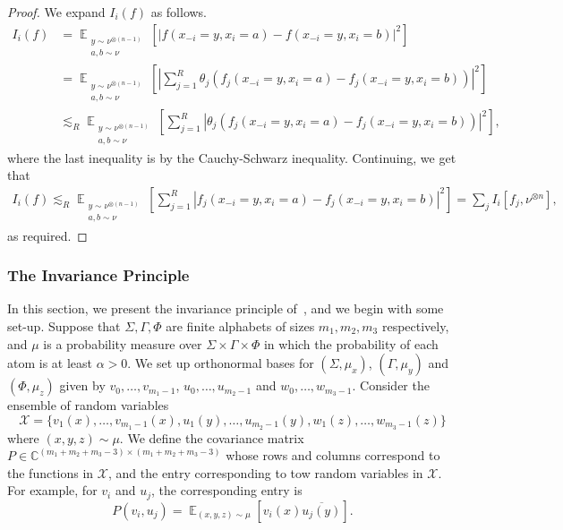 \documentclass[11pt]{article}
\newcommand\card[1]{\left| {#1} \right|}
\newcommand\Expect[2]{{\mathop{\mathbb{E}}_{#1}\left[ {#2} \right]}}
\renewcommand\leq{\leqslant}
\newcommand{\V}[1]{{#1}}
\begin{document}
\begin{proof}
We expand $I_i(f)$ as follows.
 \begin{align*}
       I_i(f)&= \Expect{\substack{\V y\sim \nu^{\otimes (n-1)}\\ a, b \sim \nu} }{\card{ f( \V x_{-i} = \V y, x_i = a) - f(\V x_{-i} = \V y, x_i = b) }^2}\\
       & = \Expect{\substack{\V y\sim \nu^{\otimes (n-1)}\\ a, b \sim \nu} }{\card{\sum_{j=1}^R \theta_j (f_j( \V x_{-i} = \V y, x_i = a) - f_j(\V x_{-i} = \V y, x_i = b))}^2}\\
       & \lesssim_R \Expect{\substack{\V y\sim \nu^{\otimes (n-1)}\\ a, b \sim \nu} }{\sum_{j=1}^R \card{\theta_j (f_j( \V x_{-i} = \V y, x_i = a) - f_j(\V x_{-i} = \V y, x_i = b))}^2},
       \end{align*}
       where the last inequality is by the Cauchy-Schwarz inequality. Continuing, we get that
       \begin{align*}
       I_i(f)\lesssim_R 
       \Expect{\substack{\V y\sim \nu^{\otimes (n-1)}\\ a, b \sim \nu} }{\sum_{j=1}^R \card{f_j( \V x_{-i} = \V y, x_i = a) - f_j(\V x_{-i} = \V y, x_i = b)}^2}
          = \sum_{j}I_i[f_j, \nu^{\otimes n}],
   \end{align*}
   as required.
\end{proof}
\subsubsection{The Invariance Principle}\label{sec:invariance_principle}
In this section, we present the invariance principle of~\cite{MOO}, and we begin with some set-up.
Suppose that $\Sigma,\Gamma,\Phi$ are finite alphabets of sizes $m_1,m_2,m_3$ respectively, and
$\mu$ is a probability measure over $\Sigma\times \Gamma\times \Phi$ in which the probability of
each atom is at least $\alpha>0$. We set up orthonormal bases for $(\Sigma,\mu_x)$,
$(\Gamma,\mu_y)$ and $(\Phi,\mu_z)$ given by $v_0,\ldots,v_{m_1-1}$,
$u_0,\ldots,u_{m_2-1}$ and $w_0,\ldots,w_{m_3-1}$. Consider the ensemble of random
variables
\[
\mathcal{X} = \{v_1(x),\ldots,v_{m_1-1}(x),u_1(y),\ldots,u_{m_2-1}(y),w_1(z),\ldots,w_{m_3-1}(z)\}
\]
where $(x,y,z)\sim \mu$. We define the covariance matrix
$P\in\mathbb{C}^{(m_1+m_2+m_3-3)\times(m_1+m_2+m_3-3)}$ whose rows and columns correspond
to the functions in $\mathcal{X}$, and the entry corresponding to tow random variables
in $\mathcal{X}$.
For example, for $v_i$ and $u_j$,
the corresponding entry is
\[
P(v_i,u_j) = \Expect{(x,y,z)\sim \mu}{v_i(x)\overline{u_j(y)}}.
\]
\end{document}
